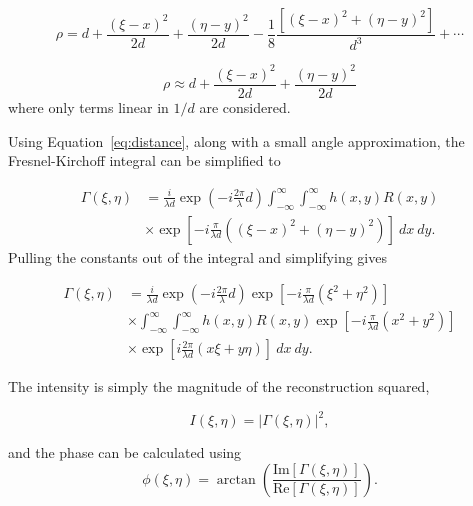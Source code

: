     \begin{equation}
        \rho=d+\frac{(\xi-x)^{2}}{2d}+\frac{(\eta-y)^{2}}{2d}-\frac{1}{8}\frac{\left[
        (\xi-x)^{2}+(\eta-y)^{2} \right]}{d^{3}} + \cdots
    \end{equation}

    \begin{equation}
        \rho\approx d+\frac{(\xi-x)^{2}}{2d}+\frac{(\eta-y)^{2}}{2d}
        \label{eq:distance}
    \end{equation}
    where only terms linear in $1/d$ are considered.

    Using Equation~\ref{eq:distance}, along with a small angle approximation, the Fresnel-Kirchoff
    integral can be simplified to

    \begin{equation}
        \begin{aligned}
        \Gamma(\xi,\eta) &= \frac{i}{\lambda d} \exp\left( -i\frac{2\pi}{\lambda}d \right)
        \int_{-\infty}^{\infty}\int_{-\infty}^{\infty}h(x,y)R(x,y) \\
        & \times \exp\left[ -i\frac{\pi}{\lambda d}\left(
        (\xi-x)^{2}+(\eta-y)^{2} \right) \right]~dx~dy .
        \end{aligned}
    \end{equation}
Pulling the constants out of the integral and simplifying gives

    \begin{equation}
        \begin{aligned}
        \Gamma(\xi,\eta) &= \frac{i}{\lambda d} \exp\left( -i\frac{2\pi}{\lambda}d \right)
        \exp\left[ -i\frac{\pi}{\lambda d}(\xi^2+\eta^2) \right] \\
        &\times \int_{-\infty}^{\infty}\int_{-\infty}^{\infty}h(x,y)R(x,y)
        \exp\left[ -i\frac{\pi}{\lambda d}\left(
        x^{2}+y^{2} \right) \right] \\
        & \times \exp\left[ i\frac{2\pi}{\lambda d}\left(
        x\xi+y\eta \right) \right]~dx~dy .
        \end{aligned}
        \label{eq:last}
    \end{equation}

    The intensity is simply the magnitude of the reconstruction squared,

    \begin{equation}
        I(\xi,\eta) = |\Gamma(\xi,\eta)|^{2} ,
    \end{equation}

    and the phase can be calculated using
    \begin{equation}
        \phi(\xi,\eta)=\arctan\left(
        \frac{\mathrm{Im}[\Gamma(\xi,\eta)]}{\mathrm{Re}[\Gamma(\xi,\eta)]}
        \right).
    \end{equation}


